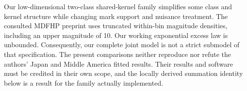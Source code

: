 Our low-dimensional two-class shared-kernel family simplifies some class
and kernel structure while changing mark support and nuisance treatment.
The consulted MDFHP preprint \citep[Section~2]{DavisBaeumerWangPreprint2024}
uses truncated within-bin magnitude densities, including an upper magnitude
of 10. Our working exponential excess law is
unbounded. Consequently, our complete joint model is not a strict submodel
of that specification. The present comparisons neither reproduce nor refute
the authors' Japan and Middle America fitted results. Their results and
software must be credited in their own scope, and the locally derived
summation identity below is a result for the family actually implemented.
